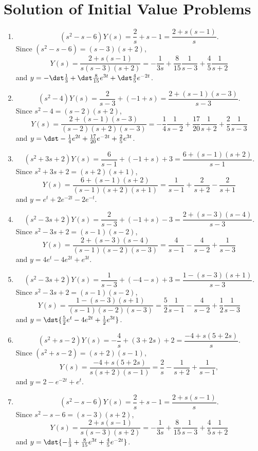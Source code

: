 \documentclass[openany]{book}
\newenvironment{sectionSolutions}{
 \begin{enumerate}[item-label={\thesection.\arabic{enumi}.}]
}{
 \end{enumerate}
}
\begin{document}
\section{Solution of Initial Value Problems}
\begin{sectionSolutions}
\item
\[
(s^2-s-6)Y(s)=\frac{2}{ s}+s-1=\frac{2+s(s-1)}{ s}.
\]
Since $(s^2-s-6)=(s-3)(s+2)$,
\[
Y(s)=\frac{2+s(s-1)}{ s(s-3)(s+2)}
=-\frac{1}{3s}+\frac{8}{15}\frac{1}{ s-3}+\frac{4}{5}\frac{1}{
s+2}
\]
and $y=-\dst\frac{1}{3}+\dst\frac{8}{15}e^{3t}+\dst\frac{4}{5}e^{-2t}$.


\item
\[
(s^2-4)Y(s)=\frac{2}{ s-3}+(-1+s)=\frac{2+(s-1)(s-3)}{ s-3}.
\]
Since $s^2-4=(s-2)(s+2)$,
\[
Y(s)=\frac{2+(s-1)(s-3)}{(s-2)(s+2)(s-3)}=
-\frac{1}{4}\frac{1}{ s-2}+\frac{17}{20}\frac{1}{ s+2}+\frac{2}{5}\frac{1}{ s-3}
\]
and   $y=\dst-\frac{1}{4}e^{2t}+\frac{17}{
20}e^{-2t}+\frac{2}{5}e^{3t}$.


\item
\[
(s^2+3s+2)Y(s)=\frac{6}{ s-1}+(-1+s)+3=\frac{6+(s-1)(s+2)}{ s-1}.
\]
Since $s^2+3s+2=(s+2)(s+1)$,
\[
Y(s)=\frac{6+(s-1)(s+2)}{(s-1)(s+2)(s+1)}=
\frac{1}{ s-1}+\frac{2}{ s+2}-\frac{2}{ s+1}
\]
and
 $y=e^t+2e^{-2t}-2e^{-t}$.


\item
\[
 (s^2-3s+2)Y(s)=\frac{2}{ s-3}+(-1+s)-3=\frac{2+(s-3)(s-4)}{ s-3}.
\]
Since $s^2-3s+2=(s-1)(s-2)$,
\[
Y(s)=\frac{2+(s-3)(s-4)}{(s-1)(s-2)(s-3)}=
\frac{4}{ s-1}-\frac{4}{ s-2}+\frac{1}{ s-3}
\]
and
  $y=4e^t-4e^{2t}+e^{3t}$.



\item
\[
(s^2-3s+2)Y(s)=\frac{1}{ s-3}+(-4-s)+3=\frac{1-(s-3)(s+1)}{ s-3}.
\]
Since $s^2-3s+2=(s-1)(s-2)$,
\[
Y(s)=\frac{1-(s-3)(s+1)}{(s-1)(s-2)(s-3)}=
\frac{5}{2}\frac{1}{ s-1}-\frac{4}{ s-2}+\frac{1}{2}\frac{1}{ s-3}
\]
and
  $y=\dst{\frac{5}{2}e^t-4e^{2t}+\frac{1}{
2}e^{3t}}$.



\item
\[
(s^2+s-2)Y(s)=-\frac{4}{ s}+(3+2s)+2=\frac{-4+s(5+2s)}{ s}.
\]
Since $(s^2+s-2)=(s+2)(s-1)$,
\[
Y(s)=\frac{-4+s(5+2s)}{ s(s+2)(s-1)}
=\frac{2}{ s}-\frac{1}{ s+2}+\frac{1}{ s-1},
\]
and  $y=2-e^{-2t}+e^t$.



\item
\[
 (s^2-s-6)Y(s)=\frac{2}{ s}+s-1=\frac{2+s(s-1)}{ s}.
\]
Since $s^2-s-6=(s-3)(s+2)$,
\[
Y(s)=\frac{2+s(s-1)}{ s(s-3)(s+2)}=
-\frac{1}{3s}+\frac{8}{15}\frac{1}{ s-3}+\frac{4}{5}\frac{1}{ s+2}
\]
and
 $y=\dst{-\frac{1}{3}+\frac{8}{15}e^{3t}
+\frac{4}{5}e^{-2t}}$.



\end{sectionSolutions}
\end{document}
